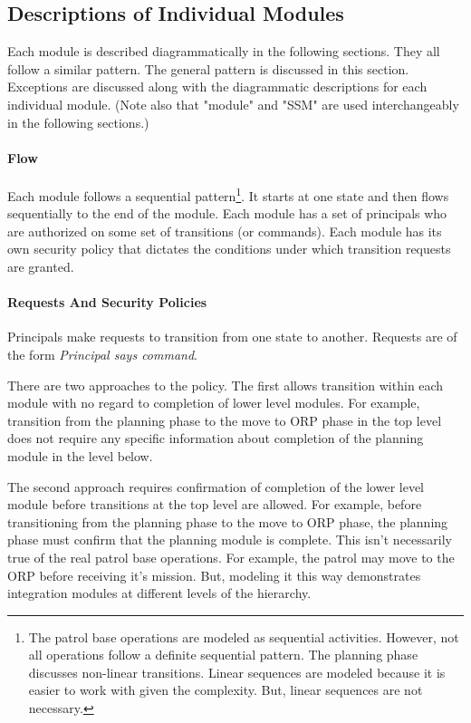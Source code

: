 \documentclass[../../main/main.tex]{subfiles}
\begin{document}
\subsection{Descriptions of Individual Modules}
Each module is described diagrammatically in the following sections.  They all follow a similar pattern.  The general pattern is discussed in this section.  Exceptions are discussed along with the diagrammatic descriptions for each individual module. (Note also that "module" and "SSM" are used interchangeably in the following sections.)

\paragraph*{Flow}
Each module follows a sequential pattern\footnote{The patrol base operations are modeled as sequential activities.  However, not all operations follow a definite sequential pattern.  The planning phase discusses non-linear transitions.  Linear sequences are modeled because it is easier to work with given the complexity.  But, linear sequences are not necessary.}.  It starts at one state and then flows sequentially to the end of the module. Each module has a set of principals who are authorized on some set of transitions (or commands).  Each module has its own security policy that dictates the conditions under which transition requests are granted.  

\paragraph*{Requests And Security Policies}
Principals make requests to transition from one state to another.  Requests are of the form \textit{Principal says command}.  

There are two approaches to the policy.  The first allows transition within each module with no regard to completion of lower level modules.  For example, transition from the planning phase to the move to ORP phase in the top level does not require any specific information about completion of the planning module in the level below.

The second approach requires confirmation of completion of the lower level module before transitions at the top level are allowed.  For example, before transitioning from the planning phase to the move to ORP phase, the planning phase must confirm that the planning module is complete.   This isn't necessarily true of the real patrol base operations.  For example, the patrol may move to the ORP before receiving it's mission.  But, modeling it this way demonstrates integration modules at different levels of the hierarchy. 
\end{document}

